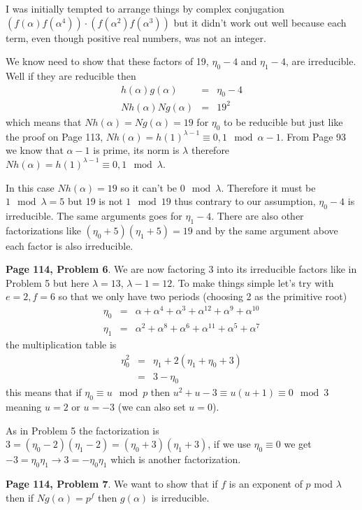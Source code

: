 \documentclass[aps,preprint,preprintnumbers,nofootinbib,showpacs,prd]{revtex4-1}
\newcommand{\nbea}{\begin{eqnarray*}}
\newcommand{\neea}{\end{eqnarray*}}
\begin{document}
I was initially tempted to arrange things by complex conjugation $(f(\alpha)f(\alpha^4)) \cdot (f(\alpha^2)f(\alpha^3))$ but it didn't work out well because each term, even though positive real numbers, was not an integer.

We know need to show that these factors of 19, $\eta_0 - 4$ and $\eta_1 - 4$, are irreducible. Well if they are reducible then
%
\nbea
h(\alpha) g(\alpha) & = & \eta_{0} - 4 \\
Nh(\alpha) Ng(\alpha) & = & 19^2
\neea
%
which means that $Nh(\alpha) = Ng(\alpha) = 19$ for $\eta_0$ to be reducible but just like the proof on Page 113, $Nh(\alpha) = h(1)^{\lambda - 1} \equiv 0,1 \mod{\alpha - 1}$. From Page 93 we know that $\alpha - 1$ is prime, its norm is $\lambda$ therefore $Nh(\alpha) = h(1)^{\lambda - 1} \equiv 0,1 \mod{\lambda}$.

In this case $Nh(\alpha) = 19$ so it can't be $0 \mod{\lambda}$. Therefore it must be $1 \mod{\lambda = 5}$ but 19 is not $1 \mod{19}$ thus contrary to our assumption, $\eta_0 - 4$ is irreducible. The same arguments goes for $\eta_1 - 4$. There are also other factorizations like $(\eta_0 + 5)(\eta_1 + 5) = 19$ and by the same argument above each factor is also irreducible.

{\bf Page 114, Problem 6}. We are now factoring 3 into its irreducible factors like in Problem 5 but here $\lambda = 13$, $\lambda - 1 = 12$. To make things simple let's try with $e = 2, f = 6$ so that we only have two periods (choosing 2 as the primitive root)
%
\nbea
\eta_0 & = & \alpha + \alpha^{4} + \alpha^{3} + \alpha^{12}+ \alpha^{9}+ \alpha^{10}\\
\eta_1 & = & \alpha^2 + \alpha^8 + \alpha^6 + \alpha^{11} + \alpha^5 + \alpha^7
\neea
%
the multiplication table is
%
\nbea
\eta_0^2 & = & \eta_1 + 2(\eta_1 + \eta_0 + 3) \\
& = & 3 - \eta_0
\neea
%
this means that if $\eta_0 \equiv u \mod{p}$ then $u^2 + u - 3 \equiv u(u+1) \equiv 0 \mod{3}$ meaning $u = 2$ or $u = -3$ (we can also set $u = 0$).

As in Problem 5 the factorization is $3 = (\eta_0 - 2)(\eta_1 - 2) = (\eta_0 + 3)(\eta_1 + 3)$, if we use $\eta_0 \equiv 0$ we get $-3 = \eta_0 \eta_1 \to 3 = -\eta_0\eta_1$ which is another factorization.

{\bf Page 114, Problem 7}. We want to show that if $f$ is an exponent of $p$ mod $\lambda$ then if $Ng(\alpha) = p^f$ then $g(\alpha)$ is irreducible. 
\end{document}
